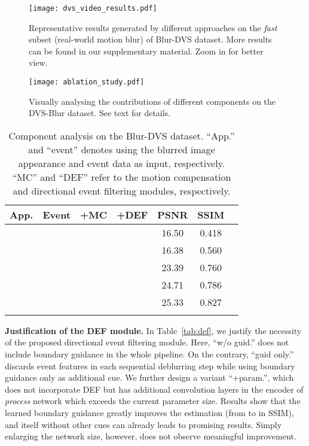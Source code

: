 \documentclass[10pt,twocolumn,letterpaper]{article}
\newcommand{\cmark}{\ding{51}}\newcommand{\xmark}{\ding{55}}\newcommand{\upcite}[1]{\textsuperscript{\textsuperscript{\cite{#1}}}}
\begin{document}
\begin{figure*}[t!]
	\centering
	\texttt{[image: dvs\_video\_results.pdf]}
	\caption{Representative results generated by different approaches on the \textit{fast} subset (real-world motion blur) of Blur-DVS dataset. More results can be found in our supplementary material. Zoom in for better view.} 
	\label{fig:dvs_real_results}
	\vspace{-7mm}
\end{figure*}

\begin{figure}
	\centering
	\texttt{[image: ablation\_study.pdf]}
	\caption{Visually analysing the contributions of different components on the DVS-Blur dataset. See text for details. } 
	\label{fig:ablation_study}
\end{figure}

\begin{table}[t!]
	\centering
	\small
	\caption{Component analysis on the Blur-DVS dataset. ``App.'' and ``event'' denotes using the blurred image appearance and event data as input, respectively. ``MC'' and ``DEF'' refer to the motion compensation and directional event filtering modules, respectively.}
	\begin{tabular}{ccccccc}
		\toprule
		App. & Event & +MC & +DEF & PSNR & SSIM \\
		\midrule
		\cmark & \xmark & \xmark & \xmark & 16.50 & 0.418 \\
		\xmark & \cmark & \cmark  & \xmark  & 16.38 & 0.560 \\
		\cmark & \cmark & \xmark  & \xmark  & 23.39 & 0.760 \\
		\cmark & \cmark & \cmark  & \xmark  & 24.71 & 0.786 \\
		\cmark & \cmark & \cmark  & \cmark  & 25.33 & 0.827 \\
		\bottomrule
		\label{tab:ablation_study}
	\end{tabular}
	\vspace{-8mm}
\end{table}

\textbf{Justification of the DEF module.} In Table~\ref{tab:def}, we justify the necessity of the proposed directional event filtering module. Here, ``w/o guid.'' does not include boundary guidance in the whole pipeline. On the contrary, ``guid only.'' discards event features in each sequential deblurring step while using boundary guidance only as additional cue. We further design a variant ``+param.'', which does not incorporate DEF but has additional convolution layers in the encoder of \textit{process} network which exceeds the current parameter size. Results show that the learned boundary guidance greatly improves the estimation (from  to  in SSIM), and itself without other cues can already leads to promising results. Simply enlarging the network size, however, does not observe meaningful improvement.
\end{document}
